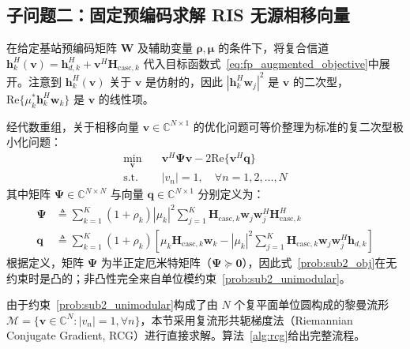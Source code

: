 \subsection{子问题二：固定预编码求解 RIS 无源相移向量}
\label{sec:sub_v}

在给定基站预编码矩阵 $\bm{W}$ 及辅助变量 $\bm{\rho}, \bm{\mu}$ 的条件下，将复合信道 $\bm{h}_k^H(\bm{v}) = \bm{h}_{d,k}^H + \bm{v}^H \bm{H}_{\mathrm{casc},k}$ 代入目标函数式~\eqref{eq:fp_augmented_objective}中展开。注意到 $\bm{h}_k^H(\bm{v})$ 关于 $\bm{v}$ 是仿射的，因此 $|\bm{h}_k^H\bm{w}_j|^2$ 是 $\bm{v}$ 的二次型，$\mathrm{Re}\{\mu_k^*\bm{h}_k^H\bm{w}_k\}$ 是 $\bm{v}$ 的线性项。

经代数重组，关于相移向量 $\bm{v} \in \mathbb{C}^{N \times 1}$ 的优化问题可等价整理为标准的复二次型极小化问题：
\begin{subequations}
  \label{prob:sub2_v_opt}
  \begin{align}
    \min_{\bm{v}} \quad & \bm{v}^H \bm{\Psi} \bm{v} - 2\mathrm{Re}\{\bm{v}^H \bm{q}\} \label{prob:sub2_obj} \\
    \text{s.t.} \quad & |v_n| = 1, \quad \forall n = 1, 2, \dots, N \label{prob:sub2_unimodular}
  \end{align}
\end{subequations}
其中矩阵 $\bm{\Psi} \in \mathbb{C}^{N \times N}$ 与向量 $\bm{q} \in \mathbb{C}^{N \times 1}$ 分别定义为：
\begin{align}
  \bm{\Psi} &\triangleq \sum_{k=1}^K (1+\rho_k)|\mu_k|^2 \sum_{j=1}^K \bm{H}_{\mathrm{casc},k} \bm{w}_j \bm{w}_j^H \bm{H}_{\mathrm{casc},k}^H \label{eq:psi_matrix_def} \\
  \bm{q} &\triangleq \sum_{k=1}^K (1+\rho_k)\left[ \mu_k \bm{H}_{\mathrm{casc},k}\bm{w}_k - |\mu_k|^2 \sum_{j=1}^K \bm{H}_{\mathrm{casc},k} \bm{w}_j \bm{w}_j^H \bm{h}_{d,k} \right] \label{eq:q_vector_def}
\end{align}
根据定义，矩阵 $\bm{\Psi}$ 为半正定厄米特矩阵（$\bm{\Psi} \succeq \bm{0}$），因此式~\eqref{prob:sub2_obj}在无约束时是凸的；非凸性完全来自单位模约束~\eqref{prob:sub2_unimodular}。

由于约束~\eqref{prob:sub2_unimodular}构成了由 $N$ 个复平面单位圆构成的黎曼流形 $\mathcal{M} = \{\bm{v} \in \mathbb{C}^N : |v_n|=1, \forall n\}$，本节采用复流形共轭梯度法（Riemannian Conjugate Gradient, RCG）进行直接求解。算法~\ref{alg:rcg}给出完整流程。

